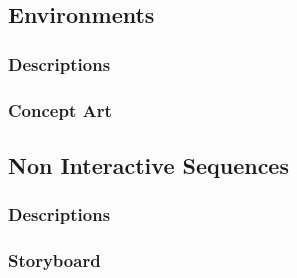     \subsection{\Large Environments}
        \subsubsection{\Large Descriptions}
        \subsubsection{\Large Concept Art}
    \subsection{\Large Non Interactive Sequences}
        \subsubsection{\Large Descriptions}
        \subsubsection{\Large Storyboard}
